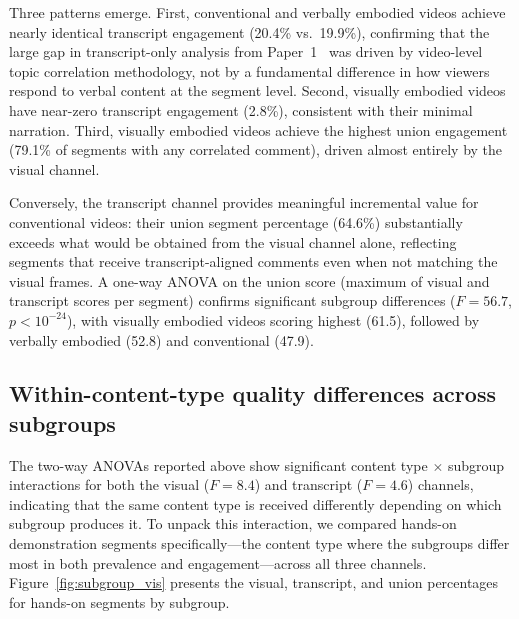 \documentclass[fleqn,10pt]{wlscirep}
\begin{document}
Three patterns emerge. First, conventional and verbally embodied videos achieve nearly identical transcript engagement (20.4\% vs.\ 19.9\%), confirming that the large gap in transcript-only analysis from Paper~1~\cite{zhang2025transcript} was driven by video-level topic correlation methodology, not by a fundamental difference in how viewers respond to verbal content at the segment level. Second, visually embodied videos have near-zero transcript engagement (2.8\%), consistent with their minimal narration. Third, visually embodied videos achieve the highest union engagement (79.1\% of segments with any correlated comment), driven almost entirely by the visual channel.

Conversely, the transcript channel provides meaningful incremental value for conventional videos: their union segment percentage (64.6\%) substantially exceeds what would be obtained from the visual channel alone, reflecting segments that receive transcript-aligned comments even when not matching the visual frames. A one-way ANOVA on the union score (maximum of visual and transcript scores per segment) confirms significant subgroup differences ($F = 56.7$, $p < 10^{-24}$), with visually embodied videos scoring highest (61.5), followed by verbally embodied (52.8) and conventional (47.9).


\subsection*{Within-content-type quality differences across subgroups}

The two-way ANOVAs reported above show significant content type $\times$ subgroup interactions for both the visual ($F = 8.4$) and transcript ($F = 4.6$) channels, indicating that the same content type is received differently depending on which subgroup produces it. To unpack this interaction, we compared hands-on demonstration segments specifically---the content type where the subgroups differ most in both prevalence and engagement---across all three channels. Figure~\ref{fig:subgroup_vis} presents the visual, transcript, and union percentages for hands-on segments by subgroup.
\end{document}
